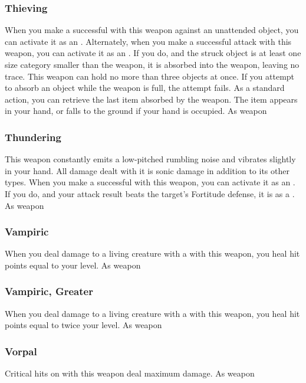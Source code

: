 \hypertarget{item:Thieving}{\subsubsection{Thieving\hfill{}}}
When you make a successful  with this weapon against an unattended object, you can activate it as an .
Alternately, when you make a successful  attack with this weapon, you can activate it as an .
If you do, and the struck object is at least one size category smaller than the weapon, it is absorbed into the weapon, leaving no trace.
This weapon can hold no more than three objects at once.
If you attempt to absorb an object while the weapon is full, the attempt fails.
As a standard action, you can retrieve the last item absorbed by the weapon.
The item appears in your hand, or falls to the ground if your hand is occupied.
 
 As weapon
\lowercase{\hypertarget{item:Thundering}{}}\label{item:Thundering}
\hypertarget{item:Thundering}{\subsubsection{Thundering\hfill{}}}
This weapon constantly emits a low-pitched rumbling noise and vibrates slightly in your hand.
All damage dealt with it is sonic damage in addition to its other types.
When you make a successful  with this weapon, you can activate it as an .
If you do, and your attack result beats the target's Fortitude defense, it is \deafened as a .
 
 As weapon
\lowercase{\hypertarget{item:Vampiric}{}}\label{item:Vampiric}
\hypertarget{item:Vampiric}{\subsubsection{Vampiric\hfill{}}}
When you deal damage to a living creature with a  with this weapon, you heal hit points equal to your level.
 
 As weapon
\lowercase{\hypertarget{item:Vampiric, Greater}{}}\label{item:Vampiric, Greater}
\hypertarget{item:Vampiric, Greater}{\subsubsection{Vampiric, Greater\hfill{}}}
When you deal damage to a living creature with a  with this weapon, you heal hit points equal to twice your level.
 
 As weapon
\lowercase{\hypertarget{item:Vorpal}{}}\label{item:Vorpal}
\hypertarget{item:Vorpal}{\subsubsection{Vorpal\hfill{}}}
Critical hits on  with this weapon deal maximum damage.
 
 As weapon
